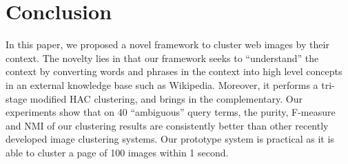 \section{Conclusion}
\label{sec:conclude}
In this paper, we proposed a novel framework to cluster web images by their
context. %
The novelty lies in that
our framework seeks to ``understand'' the context by converting words
and phrases in the context into high level concepts in an external knowledge
base such as Wikipedia. Moreover, it performs a tri-stage modified HAC clustering,
and brings in the complementary.
Our experiments
show that on 40 ``ambiguous'' query terms, the purity, F-measure and NMI
of our clustering results are
consistently better than other recently developed image clustering systems.
Our prototype system is
practical as it is able to cluster a page of 100 images within 1 second.

